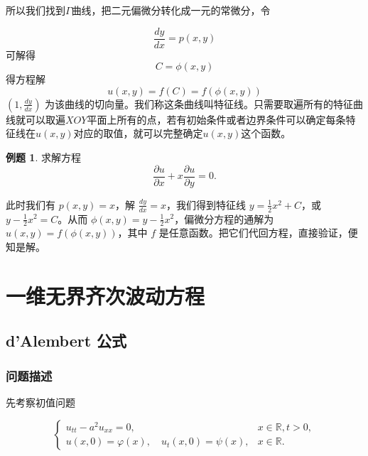 \documentclass[12pt,a4paper]{article}
\numberwithin{subsection}{section}
\numberwithin{subsubsection}{subsection}
\theoremstyle{plain}
\theoremstyle{definition}
\newtheorem{example}{例题}[subsection]
\theoremstyle{remark}
\begin{document}
	所以我们找到$\Gamma$曲线，把二元偏微分转化成一元的常微分，令
	
	\begin{equation}
		\frac{dy}{dx} = p(x, y)
	\end{equation}
	可解得
	\begin{equation}
		C=\phi(x,y)
	\end{equation}
	得方程解
	\begin{equation}
		u(x, y)=f(C)=f(\phi(x,y))
	\end{equation}
	$(1, \frac{dy}{dx})$
	为该曲线的切向量。我们称这条曲线叫特征线。只需要取遍所有的特征曲线就可以取遍$XOY$平面上所有的点，若有初始条件或者边界条件可以确定每条特征线在$u(x, y)$对应的取值，就可以完整确定$u(x, y)$这个函数。
	
	\begin{example}求解方程
		\begin{equation}
			\frac{\partial u}{\partial x} + x \frac{\partial u}{\partial y} = 0.
		\end{equation}
		
		此时我们有 $p(x, y) = x$，解 $\frac{dy}{dx} = x$，我们得到特征线 $y = \frac{1}{2}x^2 + C$，或 $y - \frac{1}{2}x^2 = C$。从而 $\phi(x, y) = y - \frac{1}{2}x^2$，偏微分方程的通解为 $u(x, y) = f(\phi(x, y))$，其中 $f$ 是任意函数。把它们代回方程，直接验证，便知是解。
	\end{example}
	
	\newpage
	
	\section{一维无界齐次波动方程}
	
	\subsection{d’Alembert 公式}
	
	\subsubsection{问题描述}
	先考察初值问题
	
	\begin{equation}\label{一维无界波动方程}
		\begin{cases}
			u_{tt} - a^2 u_{xx} = 0, & x \in \mathbb{R}, t > 0, \\
			u(x, 0) = \varphi(x), \quad u_t(x, 0) = \psi(x), & x \in \mathbb{R}.
		\end{cases}
	\end{equation}
	
\end{document}
